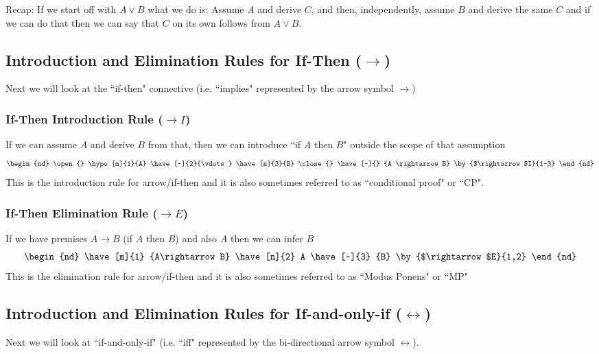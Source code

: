 Recap: If we start off with $A\lor B$ what we do is: Assume $A$ and derive $C$, and then, independently, assume $B$ and derive the same $C$ and if we can do that then we can say that $C$ on its own follows from $A\lor B$.
\subsection{Introduction and Elimination Rules for If-Then ($\rightarrow$)}
Next we will look at the ``if-then" connective (i.e. ``implies" represented by the arrow symbol $\rightarrow$)
\subsubsection{If-Then Introduction Rule ($\rightarrow I$)}
If we can assume $A$ and derive $B$ from that, then we can introduce ``if $A$ then $B$" outside the scope of that assumption
\begin{equation}
    \begin{nd}
    \open{}
        \hypo[m]{1}{A}
        \have[~]{2}{\vdots}
        \have[n]{3}{B}
        \close{}
        \have[~]{} {A \rightarrow B} \by{$\rightarrow$I}{1-3}
    \end{nd} \nonumber
\end{equation}
This is the introduction rule for arrow/if-then and it is also sometimes referred to as ``conditional proof" or ``CP".

\subsubsection{If-Then Elimination Rule ($\rightarrow E$)}
If we have premises $A\rightarrow B$ (if $A$ then $B$) and also $A$ then we can infer $B$
\begin{equation}
    \begin{nd}
        \have[m]{1} {A\rightarrow B}
        \have[n]{2} A
        \have[~]{3} {B} \by{$\rightarrow$E}{1,2}
    \end{nd} \nonumber
\end{equation}
This is the elimination rule for arrow/if-then and it is also sometimes referred to as ``Modus Ponens" or ``MP"

\subsection{Introduction and Elimination Rules for If-and-only-if ($\leftrightarrow$)}
Next we will look at ``if-and-only-if" (i.e. ``iff" represented by the bi-directional arrow symbol $\leftrightarrow$).
